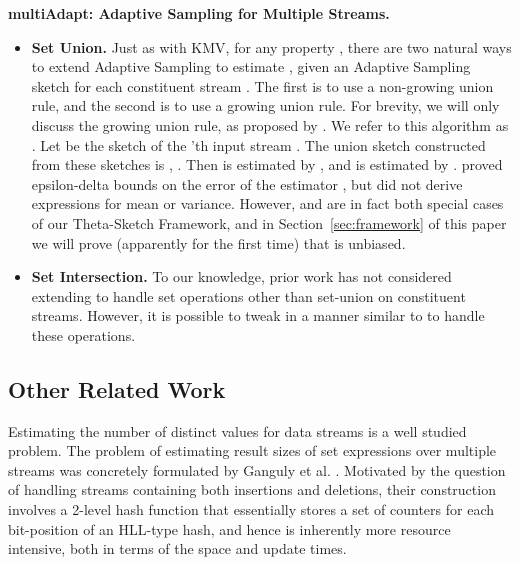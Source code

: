 \documentclass{article}
\begin{document}
\medskip \noindent \textbf{multiAdapt: Adaptive Sampling for Multiple Streams.}\label{subsubAdapt2}
\begin{itemize}
\item \textbf{Set Union.}
Just as with KMV, for any property , there are two natural ways to extend Adaptive Sampling 
to estimate , given an Adaptive Sampling sketch  for each constituent stream . 
The first is to use a non-growing union rule, and the second is to use a growing union rule. 
 For brevity, we will
only discuss the growing union rule, as proposed by
\cite{gibbons2001estimating}. We refer to this algorithm as . 
Let  be the sketch of the
'th input stream .  The union sketch constructed from these
sketches is ,\; .  
Then  is estimated by ,
and  is estimated by .  
\cite{gibbons2001estimating} proved epsilon-delta bounds on the error of the estimator
, but did not
derive expressions for mean or variance. However,  and  are in fact both special cases
of our Theta-Sketch Framework, and in Section~\ref{sec:framework}
of this paper we will prove (apparently for the first time) that  is unbiased.

\item \textbf{Set Intersection.} To our knowledge, prior work has not considered extending 
to handle set operations other than set-union on constituent streams. However, it is possible to tweak 
in a manner similar to  to handle these operations.
\end{itemize}


\subsection{Other Related Work}
\label{sec:related}
Estimating the number of distinct values for data streams is a well studied problem. The problem of estimating result sizes of set expressions over multiple streams 
was concretely formulated by Ganguly et al. \cite{ganguly2003processing}. 
Motivated by the question of handling streams containing both insertions and deletions, their construction
involves a 2-level hash function that essentially stores a set of counters for each bit-position of an HLL-type hash, 
and hence is inherently more resource intensive, both in terms of the space and update times. 
\end{document}

